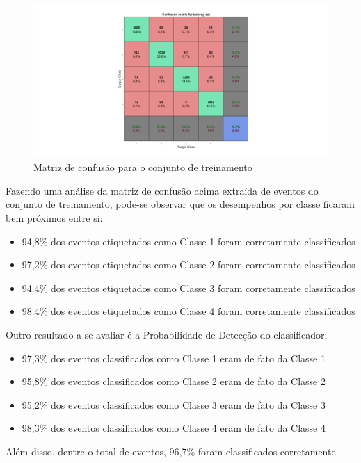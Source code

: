 \documentclass[]{report}
\begin{document}
	\begin{figure}[H]
		\vspace{-4cm}
		\hspace{-5cm}\includegraphics[width=1.8\linewidth]{picts/confusion_train.png}
		\vspace{-1.2cm}\caption{Matriz de confusão para o conjunto de treinamento}
		
		\vspace{0.8cm}
	\end{figure}
	Fazendo uma análise da matriz de confusão acima extraída de eventos do conjunto de treinamento, pode-se observar que os desempenhos por classe ficaram bem próximos entre si:
	\begin{itemize}
		\item 94,8\% dos eventos etiquetados como Classe 1 foram corretamente classificados
		\item 97,2\% dos eventos etiquetados como Classe 2 foram corretamente classificados
		\item 94.4\% dos eventos etiquetados como Classe 3 foram corretamente classificados
		\item 98.4\% dos eventos etiquetados como Classe 4 foram corretamente classificados
	\end{itemize}
	Outro resultado a se avaliar é a Probabilidade de Detecção do classificador:
	\begin{itemize}
		\item 97,3\% dos eventos classificados como Classe 1 eram de fato da Classe 1
		\item 95,8\% dos eventos classificados como Classe 2 eram de fato da Classe 2
		\item 95,2\% dos eventos classificados como Classe 3 eram de fato da Classe 3
		\item 98,3\% dos eventos classificados como Classe 4 eram de fato da Classe 4
	\end{itemize}
	\vspace{0.5cm}
	Além disso, dentre o total de eventos, 96,7\% foram classificados corretamente.
\end{document}
